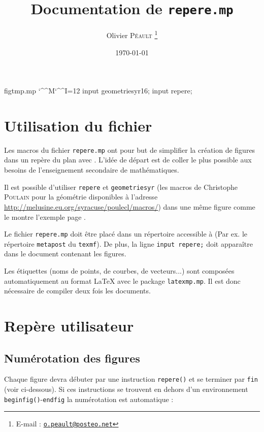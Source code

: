 \documentclass[11pt,a4paper,french]{article}
\makeatletter
\def\verbatimwrite{%
  \@bsphack
  \immediate\openout \temp@code figtmp.mp
  \let\do\@makeother\dospecials
  \catcode`\^^M\active \catcode`\^^I=12
  \def\verbatim@processline{%
    \immediate\write\verbatim@out
      {\the\verbatim@line}%
    \immediate\write\temp@code
          {\the\verbatim@line}
     }%
  \verbatim@start}
\def\endverbatimwrite{%
  \immediate\closeout\temp@code
  \@esphack
  }%
\newenvironment{codecache}%
            {\verbatimwrite}{\endverbatimwrite}
\makeatother
\begin{document}
\title{Documentation de \texttt{repere.mp}}
\date{\today}
\author{Olivier \textsc{Péault}%
\footnote{E-mail : \href{mailto:o.peault@posteo.net}{\texttt{o.peault@posteo.net}}}}
\maketitle

\setcounter{tocdepth}{2}

\setlength{\columnsep}{25pt}
\tableofcontents
\setlength{\columnsep}{10pt}




\begin{codecache}
input geometriesyr16;
input repere;
\end{codecache}


\section{Utilisation du fichier}
Les macros du fichier \verb+repere.mp+ ont pour but de simplifier la création de figures dans un repère du plan avec \MP{}. L'idée de départ est de coller le plus possible aux besoins de l'enseignement secondaire de mathématiques.

Il est possible d'utiliser \verb+repere+ et \verb+geometriesyr+ (les macros de Christophe \textsc{Poulain} pour la géométrie disponibles à l'adresse \url{http://melusine.eu.org/syracuse/poulecl/macros/}) dans une même figure comme le montre l'exemple page \pageref{exgeom}.

Le fichier \verb+repere.mp+ doit être placé dans un répertoire accessible à \MP{} (Par ex. le répertoire \verb+metapost+ du \verb+texmf+). De plus, la ligne \verb+input repere;+ doit apparaître dans le document contenant les figures.


Les étiquettes (noms de points, de courbes, de vecteurs...) sont composées automatiquement au format \LaTeX{} avec le package \verb+latexmp.mp+. Il est donc nécessaire de compiler deux fois les documents.


\section{Repère utilisateur}

\subsection{Numérotation des figures}
Chaque figure devra débuter par une instruction \verb|repere()| et se terminer par \verb|fin| (voir ci-dessous). Si ces instructions se trouvent en dehors d'un environnement \verb|beginfig()|-\verb|endfig| la numérotation est automatique :
\end{document}
